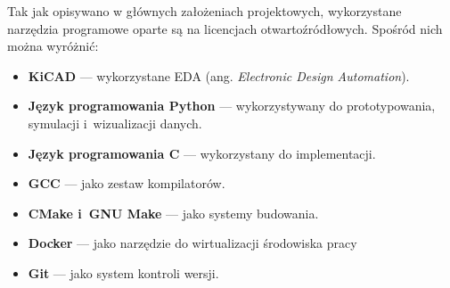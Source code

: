 Tak jak opisywano w głównych założeniach projektowych, wykorzystane narzędzia
programowe oparte są na licencjach otwartoźródłowych. Spośród nich można
wyróżnić:

\begin{itemize}
    \item \textbf{KiCAD} --- wykorzystane EDA (ang. \textit{Electronic Design Automation}).
    \item \textbf{Język programowania Python} --- wykorzystywany do
    prototypowania, symulacji i~wizualizacji danych.
    \item \textbf{Język programowania C} --- wykorzystany do implementacji.
    \item \textbf{GCC} --- jako zestaw kompilatorów.
    \item \textbf{CMake i~GNU Make} --- jako systemy budowania.
    \item \textbf{Docker} --- jako narzędzie do wirtualizacji środowiska pracy
    \item \textbf{Git} --- jako system kontroli wersji.
\end{itemize}


